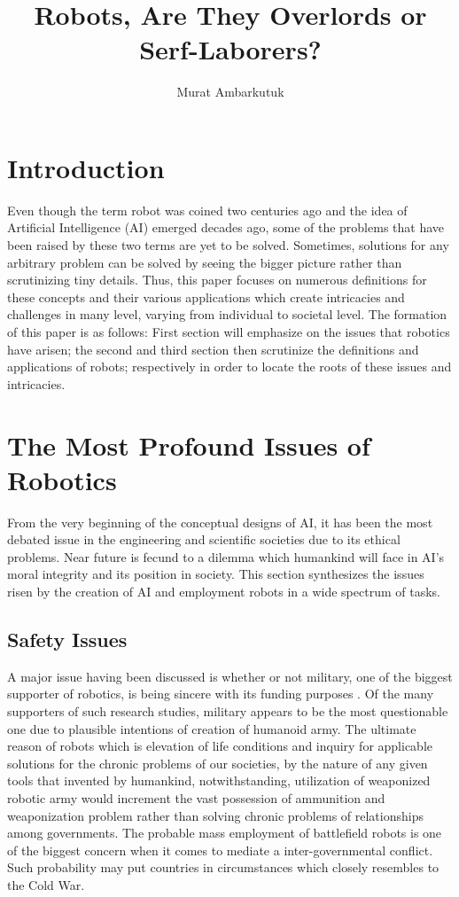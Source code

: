 \documentclass[man]{apa6}
\title{Robots, Are They Overlords or Serf-Laborers?}
\author{Murat Ambarkutuk}
\affiliation{English Language Institute, University of Delaware \\ murata@udel.
edu}
\begin{document}
\maketitle

\section{Introduction}
Even though the term robot was coined two centuries ago and the idea of Artificial Intelligence (AI) emerged decades ago, some of the problems that have been raised by these two terms are yet to be solved.
Sometimes, solutions for any arbitrary problem can be solved by seeing the bigger picture rather than scrutinizing tiny details.
Thus, this paper focuses on numerous definitions for these concepts and their various applications which create intricacies and challenges in many level, varying from individual to societal level.
The formation of this paper is as follows: First section will emphasize on the issues that robotics have arisen; the second and third section then scrutinize the definitions and applications of robots; respectively in order to locate the roots of these issues and intricacies.

\section{The Most Profound Issues of Robotics}
From the very beginning of the conceptual designs of AI, it has been the most debated issue in the engineering and scientific societies due to its ethical problems.
Near future is fecund to a dilemma which humankind will face in AI's moral integrity and its position in society.
This section synthesizes the issues risen by the creation of AI and employment robots in a wide spectrum of tasks.

\subsection{Safety Issues}
A major issue having been discussed is whether or not military, one of the biggest supporter of robotics, is being sincere with its funding purposes \cite{gre}.
Of the many supporters of such research studies, military appears to be the most questionable one due to plausible intentions of creation of humanoid army.
The ultimate reason of robots which is elevation of life conditions and inquiry for applicable solutions for the chronic problems of our societies, by the nature of any given tools that invented by humankind, notwithstanding, utilization of weaponized robotic army would increment the vast possession of ammunition and weaponization problem rather than solving chronic problems of relationships among governments.
The probable mass employment of battlefield robots is one of the biggest concern when it comes to mediate a inter-governmental conflict. Such probability may put countries in circumstances which closely resembles to the Cold War. \par
\end{document}
